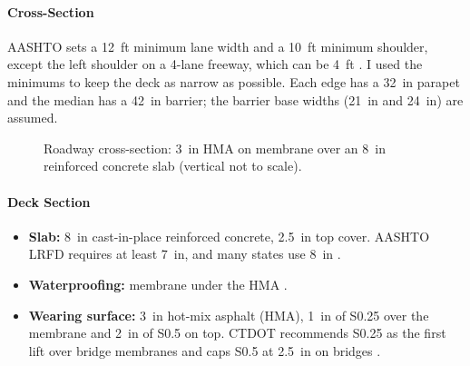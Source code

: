 \documentclass[11pt]{article}
\begin{document}
\paragraph{Cross-Section}
AASHTO sets a \SI{12}{ft} minimum lane width and a \SI{10}{ft} minimum shoulder, except the left shoulder on a 4-lane freeway, which can be \SI{4}{ft} \cite{fhwa_pts}. I used the minimums to keep the deck as narrow as possible. Each edge has a \SI{32}{in} parapet and the median has a \SI{42}{in} barrier; the barrier base widths (\SI{21}{in} and \SI{24}{in}) are assumed.

\begin{figure}[H]
\centering
{}
\caption{Roadway cross-section: \SI{3}{in} HMA on membrane over an \SI{8}{in} reinforced concrete slab (vertical not to scale).}
\label{fig:section}
\end{figure}

\paragraph{Deck Section}
\begin{itemize}
    \item \textbf{Slab:} \SI{8}{in} cast-in-place reinforced concrete, \SI{2.5}{in} top cover. AASHTO LRFD requires at least \SI{7}{in}, and many states use \SI{8}{in} \cite{fhwa_deck}.
    \item \textbf{Waterproofing:} membrane under the HMA \cite{ctdot_pdh}.
    \item \textbf{Wearing surface:} \SI{3}{in} hot-mix asphalt (HMA), \SI{1}{in} of S0.25 over the membrane and \SI{2}{in} of S0.5 on top. CTDOT recommends S0.25 as the first lift over bridge membranes and caps S0.5 at \SI{2.5}{in} on bridges \cite{ctdot_pdh}.
\end{itemize}
\end{document}
